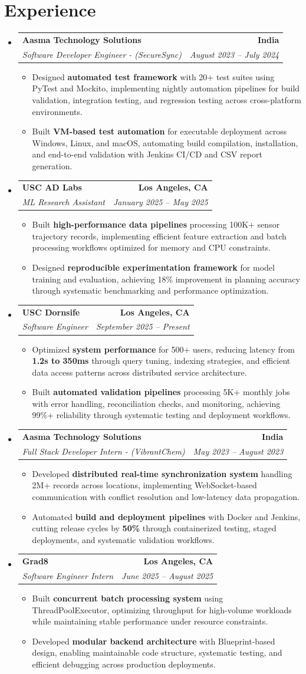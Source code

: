 \documentclass[letterpaper,10pt]{article}
\makeatletter
\newcommand{\resumeItem}[1]{\item\small{{#1 \vspace{-2pt}}}}
\newcommand{\resumeSubheading}[4]{\vspace{-1pt}\item\begin{tabular*}{1.0\textwidth}[t]{l@{\extracolsep{\fill}}r}\textbf{#1} & \textbf{\small #2} \\\textit{\small#3} & \textit{\small #4} \\\end{tabular*}\vspace{-2pt}}
\newcommand{\resumeSubHeadingListStart}{\begin{itemize}[leftmargin=0.0in, label={}]}
\newcommand{\resumeSubHeadingListEnd}{\end{itemize}}
\newcommand{\resumeItemListStart}{\begin{itemize}[leftmargin=0.15in,label=\textbullet,itemsep=2pt,topsep=0pt,parsep=0pt,partopsep=0pt]}
\newcommand{\resumeItemListEnd}{\end{itemize}\vspace{-4pt}}
\makeatother
\begin{document}
\section{Experience}
\resumeSubHeadingListStart
\resumeSubheading{Aasma Technology Solutions}{India}{Software Developer Engineer - (SecureSync)}{August 2023 -- July 2024}
\resumeItemListStart
\resumeItem{Designed \textbf{automated test framework} with 20+ test suites using PyTest and Mockito, implementing nightly automation pipelines for build validation, integration testing, and regression testing across cross-platform environments.}
\resumeItem{Built \textbf{VM-based test automation} for executable deployment across Windows, Linux, and macOS, automating build compilation, installation, and end-to-end validation with Jenkins CI/CD and CSV report generation.}
\resumeItemListEnd
\resumeSubheading{USC AD Labs}{Los Angeles, CA}{ML Research Assistant}{January 2025 -- May 2025}
\resumeItemListStart
\resumeItem{Built \textbf{high-performance data pipelines} processing 100K+ sensor trajectory records, implementing efficient feature extraction and batch processing workflows optimized for memory and CPU constraints.}
\resumeItem{Designed \textbf{reproducible experimentation framework} for model training and evaluation, achieving 18\% improvement in planning accuracy through systematic benchmarking and performance optimization.}
\resumeItemListEnd
\resumeSubheading{USC Dornsife}{Los Angeles, CA}{Software Engineer}{September 2025 -- Present}
\resumeItemListStart
\resumeItem{Optimized \textbf{system performance} for 500+ users, reducing latency from \textbf{1.2s to 350ms} through query tuning, indexing strategies, and efficient data access patterns across distributed service architecture.}
\resumeItem{Built \textbf{automated validation pipelines} processing 5K+ monthly jobs with error handling, reconciliation checks, and monitoring, achieving 99\%+ reliability through systematic testing and deployment workflows.}
\resumeItemListEnd
\resumeSubheading{Aasma Technology Solutions}{India}{Full Stack Developer Intern - (VibrantChem)}{May 2023 -- August 2023}
\resumeItemListStart
\resumeItem{Developed \textbf{distributed real-time synchronization system} handling 2M+ records across locations, implementing WebSocket-based communication with conflict resolution and low-latency data propagation.}
\resumeItem{Automated \textbf{build and deployment pipelines} with Docker and Jenkins, cutting release cycles by \textbf{50\%} through containerized testing, staged deployments, and systematic validation workflows.}
\resumeItemListEnd
\resumeSubheading{Grad8}{Los Angeles, CA}{Software Engineer Intern}{June 2025 -- August 2025}
\resumeItemListStart
\resumeItem{Built \textbf{concurrent batch processing system} using ThreadPoolExecutor, optimizing throughput for high-volume workloads while maintaining stable performance under resource constraints.}
\resumeItem{Developed \textbf{modular backend architecture} with Blueprint-based design, enabling maintainable code structure, systematic testing, and efficient debugging across production deployments.}
\resumeItemListEnd
\resumeSubHeadingListEnd
\vspace{-14pt}
\end{document}
